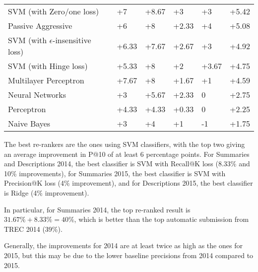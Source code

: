 \begin{table}
{\begin{tabular}{@{}llllll@{}}
SVM (with Zero/one loss)            	& +7                       & +8.67                       & +3                       & +3                          & +5.42             \\
Passive Aggressive              	& +6                       & +8                          & +2.33                    & +4                          & +5.08             \\
SVM (with $\epsilon$-insensitive loss)	& +6.33                    & +7.67                       & +2.67                    & +3                          & +4.92             \\
SVM (with Hinge loss)              	& +5.33                    & +8                          & +2                       & +3.67                       & +4.75             \\
Multilayer Perceptron            	& +7.67                    & +8                          & +1.67                    & +1                          & +4.59             \\
Neural Networks                  	& +3                       & +5.67                       & +2.33                    & 0                           & +2.75             \\
Perceptron                          	& +4.33                    & +4.33                       & +0.33                    & 0                           & +2.25             \\
Naive Bayes                        	& +3                       & +4                          & +1                       & -1                          & +1.75             \\ \bottomrule
\end{tabular}%
}
\end{table}

The best re-rankers are the ones using SVM classifiers, with the top two giving an average improvement in P@10 of at least 6 percentage
points. For Summaries and Descriptions 2014, the best classifier is SVM with Recall@K loss (8.33\% and 10\% improvements),
for Summaries 2015, the best classifier is SVM with Precision@K loss (4\% improvement),
and for Descriptions 2015, the best classifier is Ridge (4\% improvement).

In particular, for Summaries 2014, the top re-ranked result is $31.67\%+8.33\% = 40\%$, which is better than the top automatic submission
from TREC 2014 (39\%).

Generally, the improvements for 2014 are at least
twice as high as the ones for 2015, but this may be due to the lower baseline precisions from 2014 compared to 2015.

